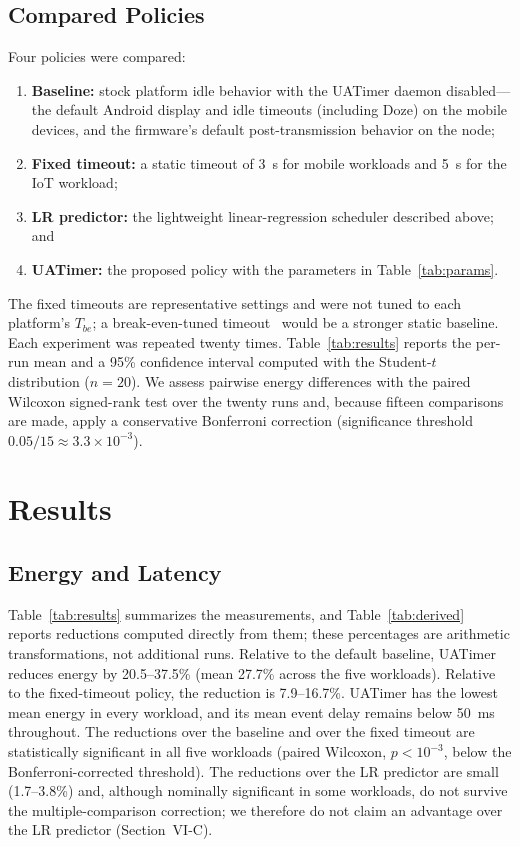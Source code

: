 \documentclass[journal]{IEEEtran}
\begin{document}
\subsection{Compared Policies}
Four policies were compared:
\begin{enumerate}
    \item \textbf{Baseline:} stock platform idle behavior with the UATimer daemon disabled---the default Android display and idle timeouts (including Doze) on the mobile devices, and the firmware's default post-transmission behavior on the node;
    \item \textbf{Fixed timeout:} a static timeout of 3~s for mobile workloads and 5~s for the IoT workload;
    \item \textbf{LR predictor:} the lightweight linear-regression scheduler described above; and
    \item \textbf{UATimer:} the proposed policy with the parameters in Table~\ref{tab:params}.
\end{enumerate}
The fixed timeouts are representative settings and were not tuned to each platform's $T_{be}$; a break-even-tuned timeout~\cite{karlin1994competitive} would be a stronger static baseline. Each experiment was repeated twenty times. Table~\ref{tab:results} reports the per-run mean and a 95\% confidence interval computed with the Student-$t$ distribution ($n=20$). We assess pairwise energy differences with the paired Wilcoxon signed-rank test over the twenty runs and, because fifteen comparisons are made, apply a conservative Bonferroni correction (significance threshold $0.05/15\approx3.3\times10^{-3}$).

\section{Results}
\subsection{Energy and Latency}
Table~\ref{tab:results} summarizes the measurements, and Table~\ref{tab:derived} reports reductions computed directly from them; these percentages are arithmetic transformations, not additional runs. Relative to the default baseline, UATimer reduces energy by 20.5--37.5\% (mean 27.7\% across the five workloads). Relative to the fixed-timeout policy, the reduction is 7.9--16.7\%. UATimer has the lowest mean energy in every workload, and its mean event delay remains below 50~ms throughout. The reductions over the baseline and over the fixed timeout are statistically significant in all five workloads (paired Wilcoxon, $p<10^{-3}$, below the Bonferroni-corrected threshold). The reductions over the LR predictor are small (1.7--3.8\%) and, although nominally significant in some workloads, do not survive the multiple-comparison correction; we therefore do not claim an advantage over the LR predictor (Section~VI-C).
\end{document}
